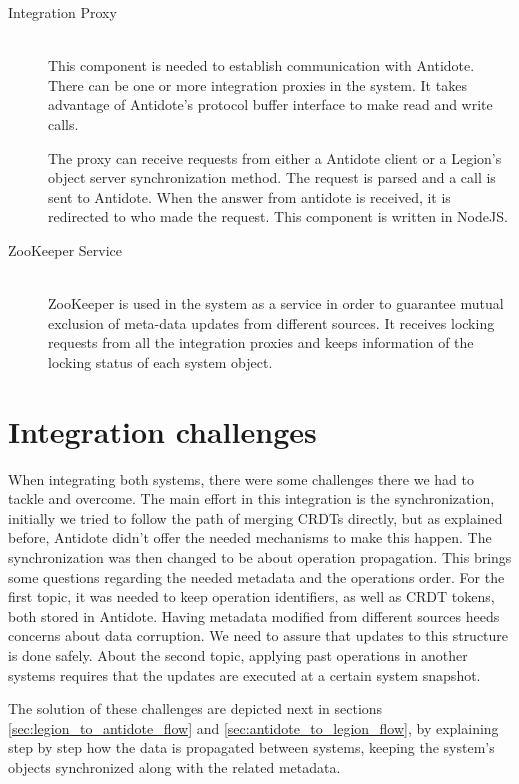 \begin{description}
\item[Integration Proxy] \hfill \\
This component is needed to establish communication with Antidote. There can be one or more integration proxies in the system. It takes advantage of Antidote's protocol buffer interface to make read and write calls.\par
The proxy can receive requests from either a Antidote client or a Legion's object server synchronization method. The request is parsed and a call is sent to Antidote. When the answer from antidote is received, it is redirected to who made the request. This component is written in NodeJS.

\item[ZooKeeper Service] \hfill \\
ZooKeeper is used in the system as a service in order to guarantee mutual exclusion of meta-data updates from different sources. It receives locking requests from all the integration proxies and keeps information of the locking status of each system object.

\end{description}

\section{Integration challenges}
\label{sec:integration_challenges}
When integrating both systems, there were some challenges there we had to tackle and overcome. The main effort in this integration is the synchronization, initially we tried to follow the path of merging CRDTs directly, but as explained before, Antidote didn't offer the needed mechanisms to make this happen. The synchronization was then changed to be about operation propagation. This brings some questions regarding the needed metadata and the operations order. For the first topic, it was needed to keep operation identifiers, as well as CRDT tokens, both stored in Antidote. Having metadata modified from different sources heeds concerns about data corruption. We need to assure that updates to this structure is done safely. About the second topic, applying past operations in another systems requires that the updates are executed at a certain system snapshot.\par
	The solution of these challenges are depicted next in sections \ref{sec:legion_to_antidote_flow} and \ref{sec:antidote_to_legion_flow}, by explaining step by step how the data is propagated between systems, keeping the system's objects synchronized along with the related metadata.

